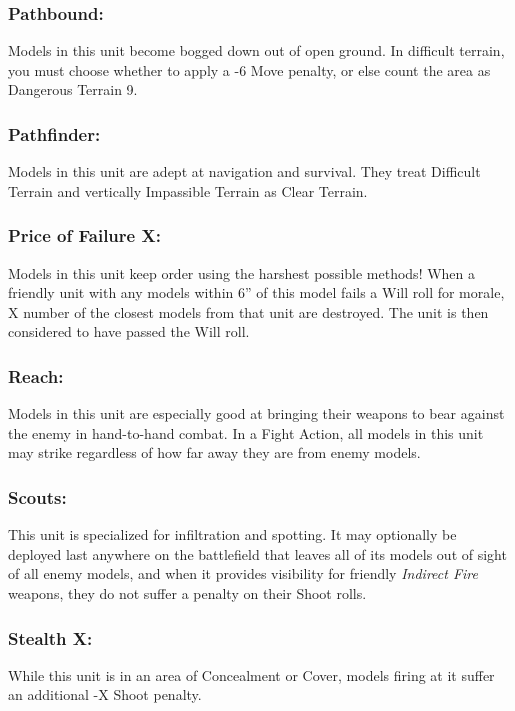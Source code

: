 \begin{multicols}{2}
\subsubsection*{Pathbound:} Models in this unit become bogged down out of open ground. In difficult terrain, you must choose whether to apply a -6 Move penalty, or else count the area as Dangerous Terrain 9.

\subsubsection*{Pathfinder:} Models in this unit are adept at navigation and survival. They treat Difficult Terrain and vertically Impassible Terrain as Clear Terrain.

\subsubsection*{Price of Failure X:} Models in this unit keep order using the harshest possible methods! When a friendly unit with any models within 6'' of this model fails a Will roll for morale, X number of the closest models from that unit are destroyed. The unit is then considered to have passed the Will roll.

\subsubsection*{Reach:} Models in this unit are especially good at bringing their weapons to bear against the enemy in hand-to-hand combat. In a Fight Action, all models in this unit may strike regardless of how far away they are from enemy models.

\subsubsection*{Scouts:} This unit is specialized for infiltration and spotting. It may optionally be deployed last anywhere on the battlefield that leaves all of its models out of sight of all enemy models, and when it provides visibility for friendly \textit{Indirect Fire} weapons, they do not suffer a penalty on their Shoot rolls.

\subsubsection*{Stealth X:} While this unit is in an area of Concealment or Cover, models firing at it suffer an additional -X Shoot penalty.


\end{multicols}
